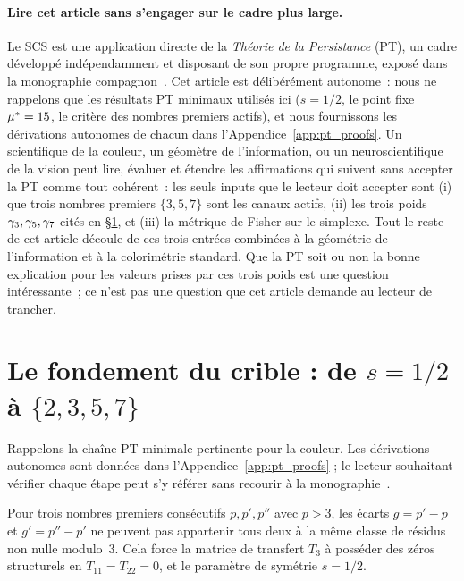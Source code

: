 \documentclass[12pt,a4paper]{article}
\begin{document}
\paragraph{Lire cet article sans s'engager sur le cadre plus large.}
Le SCS est une application directe de la \emph{Th\'eorie de la
Persistance} (PT), un cadre d\'evelopp\'e ind\'ependamment et disposant
de son propre programme, expos\'e dans la monographie
compagnon~\cite{senez2026math}. Cet article est d\'elib\'er\'ement
autonome~: nous ne rappelons que les r\'esultats PT minimaux utilis\'es
ici ($s = 1/2$, le point fixe ${\mu^{*}} = 15$, le crit\`ere des
nombres premiers actifs), et nous fournissons les d\'erivations
autonomes de chacun dans l'Appendice~\ref{app:pt_proofs}. Un
scientifique de la couleur, un g\'eom\`etre de l'information, ou un
neuroscientifique de la vision peut lire, \'evaluer et \'etendre les
affirmations qui suivent sans accepter la PT comme tout coh\'erent~:
les seuls inputs que le lecteur doit accepter sont (i) que trois
nombres premiers $\{3, 5, 7\}$ sont les canaux actifs, (ii) les trois
poids $\gamma_{3}, \gamma_{5}, \gamma_{7}$ cit\'es en
\S\ref{sec:foundation}, et (iii) la m\'etrique de Fisher sur le
simplexe. Tout le reste de cet article d\'ecoule de ces trois entr\'ees
combin\'ees \`a la g\'eom\'etrie de l'information et \`a la
colorim\'etrie standard. Que la PT soit ou non la bonne explication
pour les valeurs prises par ces trois poids est une question
int\'eressante~; ce n'est pas une question que cet article demande au
lecteur de trancher.

\section{Le fondement du crible : de $s = 1/2$ \`a $\{2, 3, 5, 7\}$}
\label{sec:foundation}

Rappelons la cha\^ine PT minimale pertinente pour la couleur.
Les d\'erivations autonomes sont donn\'ees dans
l'Appendice~\ref{app:pt_proofs} ; le lecteur souhaitant v\'erifier
chaque \'etape peut s'y r\'ef\'erer sans recourir \`a la
monographie~\cite{senez2026math}.

\begin{theorembox}
Pour trois nombres premiers cons\'ecutifs $p, p', p''$ avec $p > 3$,
les \'ecarts $g = p'-p$ et $g' = p''-p'$ ne peuvent pas appartenir
tous deux \`a la m\^eme classe de r\'esidus non nulle modulo~3. Cela
force la matrice de transfert $T_3$ \`a poss\'eder des z\'eros
structurels en $T_{11} = T_{22} = 0$, et le param\`etre de
sym\'etrie $s = 1/2$.
\end{theorembox}
\end{document}
